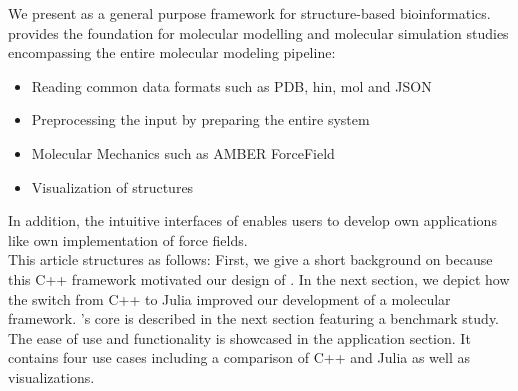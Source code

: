 We present \biochem as a general purpose framework for structure-based bioinformatics. \biochem provides the foundation for molecular modelling and molecular simulation studies encompassing the entire molecular modeling pipeline:
\begin{itemize}
	\item Reading common data formats such as PDB, hin, mol and JSON
	\item Preprocessing the input by preparing the entire system
	\item Molecular Mechanics such as AMBER ForceField
	\item Visualization of structures
\end{itemize}
In addition, the intuitive interfaces of \biochem enables users to develop own applications like own implementation of force fields. \\

This article structures as follows: First, we give a short background on \ball because this C++ framework motivated our design of \biochem. In the next section, we depict how the switch from C++ to Julia improved our development of a molecular framework. \biochem's core is described in the next section featuring a benchmark study. The ease of use and functionality is showcased in the application section. It contains four use cases including a comparison of C++ and Julia as well as visualizations. 